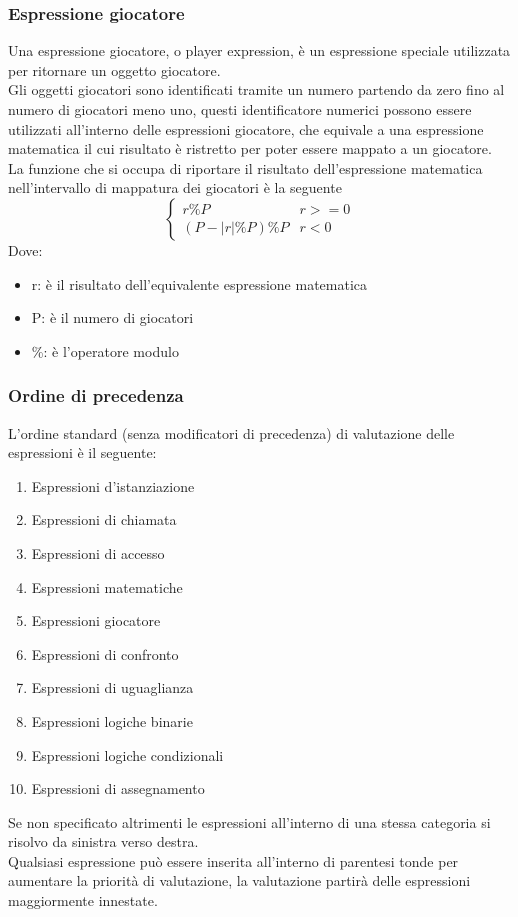 \subsubsection{Espressione giocatore}
Una espressione giocatore, o player expression, è un espressione speciale utilizzata per ritornare 
un oggetto giocatore. 
\\
Gli oggetti giocatori sono identificati tramite un numero partendo da zero fino al numero di giocatori meno uno,
questi identificatore numerici possono essere utilizzati all'interno delle espressioni giocatore, che equivale 
a una espressione matematica il cui risultato è ristretto per poter essere mappato a un giocatore.
\\
La funzione che si occupa di riportare il risultato dell'espressione matematica nell'intervallo di 
mappatura dei giocatori è la seguente
\[
\begin{cases}
    r \% P  & r >= 0 \\
    (P - |r| \% P) \% P & r < 0
\end{cases}
\] 
Dove:
\begin{itemize}
    \item r: è il risultato dell'equivalente espressione matematica
    \item P: è il numero di giocatori
    \item \%: è l'operatore modulo
\end{itemize}

\subsubsection{Ordine di precedenza}
L'ordine standard (senza modificatori di precedenza) di valutazione delle espressioni è il seguente:
\begin{enumerate}
    \item Espressioni d'istanziazione
    \item Espressioni di chiamata
    \item Espressioni di accesso
    \item Espressioni matematiche
    \item Espressioni giocatore
    \item Espressioni di confronto
    \item Espressioni di uguaglianza 
    \item Espressioni logiche binarie 
    \item Espressioni logiche condizionali 
    \item Espressioni di assegnamento
\end{enumerate}
Se non specificato altrimenti le espressioni all'interno di una stessa categoria 
si risolvo da sinistra verso destra. \\
Qualsiasi espressione può essere inserita all'interno di parentesi tonde per aumentare 
la priorità di valutazione, la valutazione partirà delle espressioni maggiormente innestate.

